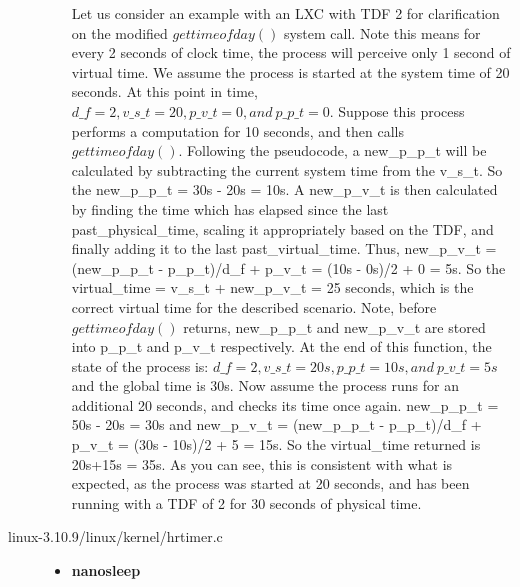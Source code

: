 \begin{description}
\begin{itemize}
Let us consider an example with an LXC with TDF 2 for clarification on the modified $gettimeofday()$ system call. Note this means for every 2 seconds of clock time, the process will perceive only 1 second of virtual time. We assume the process is started at the system time of 20 seconds. At this point in time, $d\_f=2, v\_s\_t=20, p\_v\_t=0, and\ p\_p\_t=0$. Suppose this process performs a computation for 10 seconds, and then calls $gettimeofday()$. Following the pseudocode, a new\_p\_p\_t will be calculated by subtracting the current system time from the v\_s\_t. So the new\_p\_p\_t = 30s - 20s = 10s. A new\_p\_v\_t is then calculated by finding the time which has elapsed since the last past\_physical\_time, scaling it appropriately based on the TDF, and finally adding it to the last past\_virtual\_time. Thus, new\_p\_v\_t = (new\_p\_p\_t - p\_p\_t)/d\_f + p\_v\_t = (10s - 0s)/2 + 0 = 5s. So the virtual\_time = v\_s\_t + new\_p\_v\_t = 25 seconds, which is the correct virtual time for the described scenario. Note, before $gettimeofday()$ returns, new\_p\_p\_t and new\_p\_v\_t are stored into p\_p\_t and p\_v\_t respectively. At the end of this function, the state of the process is: $d\_f=2, v\_s\_t=20s, p\_p\_t=10s, and\ p\_v\_t=5s$ and the global time is 30s. Now assume the process runs for an additional 20 seconds, and checks its time once again. new\_p\_p\_t = 50s - 20s = 30s and new\_p\_v\_t = (new\_p\_p\_t - p\_p\_t)/d\_f + p\_v\_t = (30s - 10s)/2 + 5 = 15s. So the virtual\_time returned is 20s+15s = 35s. As you can see, this is consistent with what is expected, as the process was started at 20 seconds, and has been running with a TDF of 2 for 30 seconds of physical time.
        \end{itemize}
\item[linux-3.10.9/linux/kernel/hrtimer.c] \hfill 
        \begin{itemize} 
                        \item \textbf{nanosleep} \\ 

\end{itemize}
\end{description}
